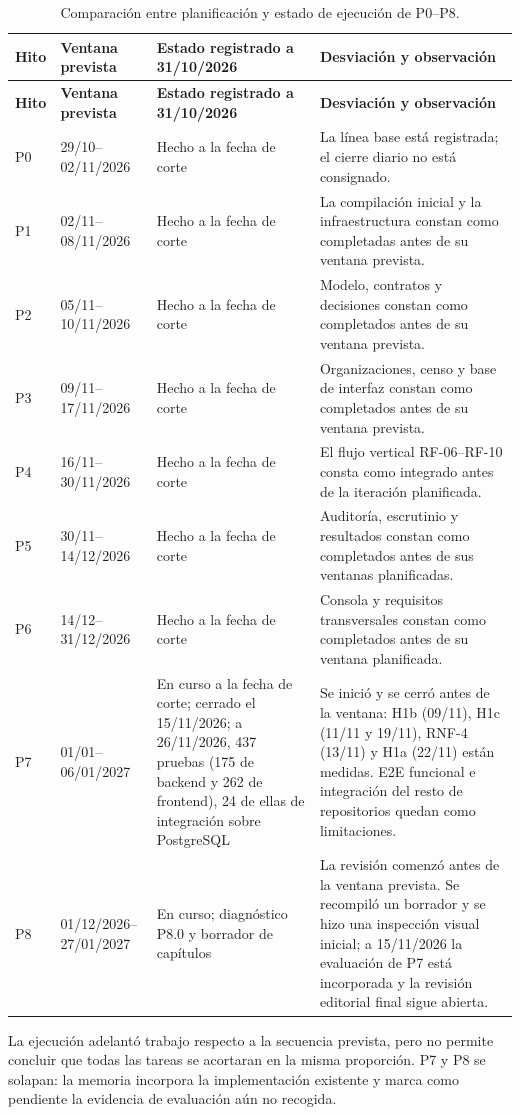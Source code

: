 \small
\setlength{\tabcolsep}{3pt}
\begin{longtable}{|p{}|p{}|p{}|p{}|}
\caption{Comparación entre planificación y estado de ejecución de P0--P8.}\label{tab:plan-previsto-real}\\
\hline
\textbf{Hito} & \textbf{Ventana prevista} & \textbf{Estado registrado a 31/10/2026} & \textbf{Desviación y observación} \\
\hline
\endfirsthead
\hline
\textbf{Hito} & \textbf{Ventana prevista} & \textbf{Estado registrado a 31/10/2026} & \textbf{Desviación y observación} \\
\hline
\endhead
\hline
\endfoot
\hline
\endlastfoot
P0 & 29/10--02/11/2026 & Hecho a la fecha de corte & La línea base está registrada; el cierre diario no está consignado. \\
\hline
P1 & 02/11--08/11/2026 & Hecho a la fecha de corte & La compilación inicial y la infraestructura constan como completadas antes de su ventana prevista. \\
\hline
P2 & 05/11--10/11/2026 & Hecho a la fecha de corte & Modelo, contratos y decisiones constan como completados antes de su ventana prevista. \\
\hline
P3 & 09/11--17/11/2026 & Hecho a la fecha de corte & Organizaciones, censo y base de interfaz constan como completados antes de su ventana prevista. \\
\hline
P4 & 16/11--30/11/2026 & Hecho a la fecha de corte & El flujo vertical RF-06--RF-10 consta como integrado antes de la iteración planificada. \\
\hline
P5 & 30/11--14/12/2026 & Hecho a la fecha de corte & Auditoría, escrutinio y resultados constan como completados antes de sus ventanas planificadas. \\
\hline
P6 & 14/12--31/12/2026 & Hecho a la fecha de corte & Consola y requisitos transversales constan como completados antes de su ventana planificada. \\
\hline
P7 & 01/01--06/01/2027 & En curso a la fecha de corte; cerrado el 15/11/2026; a 26/11/2026, 437 pruebas (175 de backend y 262 de frontend), 24 de ellas de integración sobre PostgreSQL & Se inició y se cerró antes de la ventana: H1b (09/11), H1c (11/11 y 19/11), RNF-4 (13/11) y H1a (22/11) están medidas. E2E funcional e integración del resto de repositorios quedan como limitaciones. \\
\hline
P8 & 01/12/2026--27/01/2027 & En curso; diagnóstico P8.0 y borrador de capítulos & La revisión comenzó antes de la ventana prevista. Se recompiló un borrador y se hizo una inspección visual inicial; a 15/11/2026 la evaluación de P7 está incorporada y la revisión editorial final sigue abierta. \\
\hline
\end{longtable}
\setlength{\tabcolsep}{6pt}
\normalsize

La ejecución adelantó trabajo respecto a la secuencia prevista, pero no permite
concluir que todas las tareas se acortaran en la misma proporción. P7 y P8 se
solapan: la memoria incorpora la implementación existente y marca como
pendiente la evidencia de evaluación aún no recogida.

